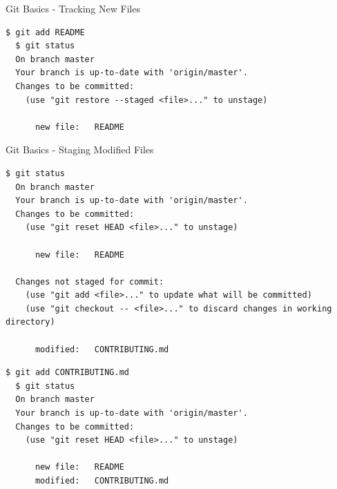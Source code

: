 \documentclass[sans,mathserif,aspectratio=169]{beamer}
\begin{document}
\begin{frame}[fragile]{Git Basics - Tracking New Files}
  \begin{lstlisting}[frame=single, backgroundcolor=\color{gray!20}, basicstyle=\tiny]
  $ git add README
  $ git status
  On branch master
  Your branch is up-to-date with 'origin/master'.
  Changes to be committed:
    (use "git restore --staged <file>..." to unstage)

      new file:   README
  \end{lstlisting}
\end{frame}

\begin{frame}[fragile]{Git Basics - Staging Modified Files}
  \begin{lstlisting}[frame=single, backgroundcolor=\color{gray!20}, basicstyle=\tiny]
  $ git status
  On branch master
  Your branch is up-to-date with 'origin/master'.
  Changes to be committed:
    (use "git reset HEAD <file>..." to unstage)

      new file:   README

  Changes not staged for commit:
    (use "git add <file>..." to update what will be committed)
    (use "git checkout -- <file>..." to discard changes in working directory)

      modified:   CONTRIBUTING.md
  \end{lstlisting}
  \pause
  \begin{lstlisting}[frame=single, backgroundcolor=\color{gray!20}, basicstyle=\tiny]
  $ git add CONTRIBUTING.md
  $ git status
  On branch master
  Your branch is up-to-date with 'origin/master'.
  Changes to be committed:
    (use "git reset HEAD <file>..." to unstage)

      new file:   README
      modified:   CONTRIBUTING.md
  \end{lstlisting}
\end{frame}
\end{document}

